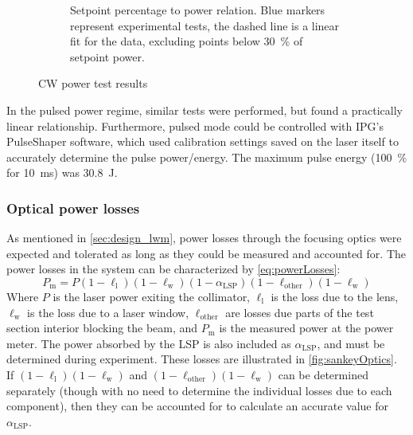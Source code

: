 \begin{figure}[h]
\begin{subfigure}[t]{3.3in}
                    \caption{Setpoint percentage to power relation. Blue markers represent experimental tests, the dashed line is a linear fit for the data, excluding points below 30~\% of setpoint power.}
                    \label{fig:cw_tests_setpoint}
                \end{subfigure}
                \caption{CW power test results}
                \label{fig:cw_tests}
            \end{figure}

            In the pulsed power regime, similar tests were performed, but found a practically linear relationship. Furthermore, pulsed mode could be controlled with IPG's PulseShaper software, which used calibration settings saved on the laser itself to accurately determine the pulse power/energy. The maximum pulse energy (100~\% for \qty{10}{ms}) was \qty{30.8}{J}.

            \subsubsection*{Optical power losses}
                As mentioned in \autoref{sec:design_lwm}, power losses through the focusing optics were expected and tolerated as long as they could be measured and accounted for. The power losses in the system can be characterized by \autoref{eq:powerLosses}:
                \begin{equation}
                    P_\mathrm{m} = P(1-\ell_\mathrm{l})(1-\ell_\mathrm{w})(1-\alpha_\mathrm{LSP})(1-\ell_\mathrm{other})(1-\ell_\mathrm{w})
                    \label{eq:powerLosses}
                \end{equation}
                Where $P$ is the laser power exiting the collimator, $\ell_\mathrm{l}$ is the loss due to the lens, $\ell_\mathrm{w}$ is the loss due to a laser window, $\ell_\mathrm{other}$ are losses due parts of the test section interior blocking the beam, and $P_\mathrm{m}$ is the measured power at the power meter. The power absorbed by the LSP is also included as $\alpha_\mathrm{LSP}$, and must be determined during experiment. These losses are illustrated in \autoref{fig:sankeyOptics}. If $(1-\ell_\mathrm{l})(1-\ell_\mathrm{w})$ and $(1-\ell_\mathrm{other})(1-\ell_\mathrm{w})$ can be determined separately (though with no need to determine the individual losses due to each component), then they can be accounted for to calculate an accurate value for $\alpha_\mathrm{LSP}$.

